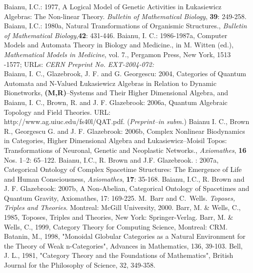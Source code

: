 \documentclass[12pt]{article}
\begin{document}
\begin{thebibliography}{199}
Baianu, I.C.: 1977, A Logical Model of Genetic Activities in \L ukasiewicz
Algebras: The Non-linear Theory. \emph{Bulletin of Mathematical Biology},
\textbf{39}: 249-258.
Baianu, I.C.: 1980a, Natural Transformations of Organismic Structures.,
\emph{Bulletin of Mathematical Biology},\textbf{42}: 431-446.
Baianu, I. C.: 1986-1987a, Computer Models and Automata Theory in Biology and Medicine.,  in M. Witten (ed.), \emph{Mathematical Models in Medicine}, vol. 7., Pergamon Press, New York, 1513 -1577; URLs: \emph{CERN Preprint No. EXT-2004-072: } \\
Baianu, I. C., Glazebrook, J. F. and G. Georgescu: 2004,
Categories of Quantum Automata and N-Valued \L ukasiewicz Algebras
in Relation to Dynamic Bionetworks, \textbf{(M,R)}--Systems and
Their Higher Dimensional Algebra,  and 
Baianu, I. C., Brown, R. and J. F. Glazebrook: 2006a, Quantum Algebraic Topology and Field Theories. URL: \\
http://www.ag.uiuc.edu/fs40l/QAT.pdf. (\emph{Preprint--in subm.})
Baianu I. C., Brown R., Georgescu G. and J. F. Glazebrook: 2006b, Complex Nonlinear Biodynamics in Categories, Higher Dimensional Algebra and \L ukasiewicz--Moisil Topos: Transformations of Neuronal, Genetic and Neoplastic Networks., \emph{Axiomathes}, \textbf{16} Nos. 1--2: 65--122.
Baianu, I.C., R. Brown and J.F. Glazebrook. : 2007a, Categorical Ontology of Complex Spacetime Structures: The Emergence of Life and Human Consciousness, \emph{Axiomathes}, \textbf{17}: 35-168.
Baianu, I.C.,  R. Brown and J. F. Glazebrook: 2007b, A Non-Abelian, Categorical Ontology of Spacetimes and Quantum Gravity, Axiomathes, 17: 169-225.
M.~Barr and C.~Wells. {\em Toposes, Triples and Theories}. Montreal: McGill University, 2000.
Barr, M. \& Wells, C., 1985, Toposes, Triples and Theories, New York: Springer-Verlag.
Barr, M. \& Wells, C., 1999, Category Theory for Computing Science, Montreal: CRM. 
Batanin, M., 1998, "Monoidal Globular Categories as a Natural Environment for the Theory of Weak n-Categories", Advances in Mathematics, 136, 39-103.   
Bell, J. L., 1981, "Category Theory and the Foundations of Mathematics", British Journal for the Philosophy of Science, 32, 349-358. 

\end{thebibliography}
\end{document}
